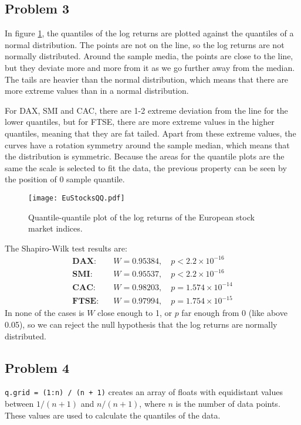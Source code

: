\documentclass{article}
\begin{document}
\subsection{Problem 3}
In figure \ref{fig:EuStocksQQ},
the quantiles of the log returns are plotted against the quantiles of a normal distribution.
The points are not on the line, so the log returns are not normally distributed.
Around the sample media, the points are close to the line,
but they deviate more and more from it as we go further away from the median.
The tails are heavier than the normal distribution,
which means that there are more extreme values than in a normal distribution.

For DAX, SMI and CAC,
there are 1-2 extreme deviation from the line for the lower quantiles,
but for FTSE,
there are more extreme values in the higher quantiles, meaning that they are fat tailed.
Apart from these extreme values,
the curves have a rotation symmetry around the sample median,
which means that the distribution is symmetric.
Because the areas for the quantile plots are the same the scale is selected to fit the data,
the previous property can be seen by the position of 0 sample quantile.

\begin{figure}[htbp]
    \centering
    \texttt{[image: EuStocksQQ.pdf]}
    \caption{Quantile-quantile plot of the log returns of the European stock market indices.}
    \label{fig:EuStocksQQ}
\end{figure}

The Shapiro-Wilk test results are:
\[
    \begin{aligned}
        \textbf{DAX:}  & \quad W = 0.95384, \quad p < 2.2 \times 10^{-16}   \\
        \textbf{SMI:}  & \quad W = 0.95537, \quad p < 2.2 \times 10^{-16}   \\
        \textbf{CAC:}  & \quad W = 0.98203, \quad p = 1.574 \times 10^{-14} \\
        \textbf{FTSE:} & \quad W = 0.97994, \quad p = 1.754 \times 10^{-15}
    \end{aligned}
\]
In none of the cases is $W$ close enough to 1, or $p$ far enough from 0 (like above 0.05),
so we can reject the null hypothesis that the log returns are normally distributed.

\subsection{Problem 4}
\texttt{q.grid = (1:n) / (n + 1)} creates an array of floats
with equidistant values between $1/(n+1)$ and $n/(n+1)$,
where $n$ is the number of data points.
These values are used to calculate the quantiles of the data.
\end{document}
